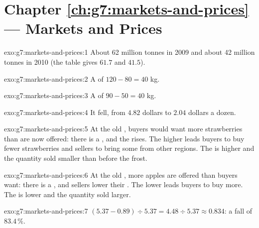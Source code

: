 \section*{Chapter \ref{ch:g7:markets-and-prices} --- Markets and Prices}

\begin{solution}{exo:g7:markets-and-prices:1}
About 62 million tonnes in 2009 and about 42 million tonnes in 2010 (the table gives $61.7$
and $41.5$).
\end{solution}

\begin{solution}{exo:g7:markets-and-prices:2}
A  of $120 - 80 = 40$ kg.
\end{solution}

\begin{solution}{exo:g7:markets-and-prices:3}
A  of $90 - 50 = 40$ kg.
\end{solution}

\begin{solution}{exo:g7:markets-and-prices:4}
It fell, from $4.82$ dollars to $2.04$ dollars a dozen.
\end{solution}

\begin{solution}{exo:g7:markets-and-prices:5}
At the old , buyers would want more strawberries than are now offered: there is a
, and the  rises. The higher  leads buyers to buy fewer strawberries and
sellers to bring some from other regions. The  is higher and the quantity sold smaller
than before the frost.
\end{solution}

\begin{solution}{exo:g7:markets-and-prices:6}
At the old , more apples are offered than buyers want: there is a , and
sellers lower their . The lower  leads buyers to buy more. The  is lower and
the quantity sold larger.
\end{solution}

\begin{solution}{exo:g7:markets-and-prices:7}
$(5.37 - 0.89) \div 5.37 = 4.48 \div 5.37 \approx 0.834$: a fall of $83.4\,\%$.
\end{solution}

